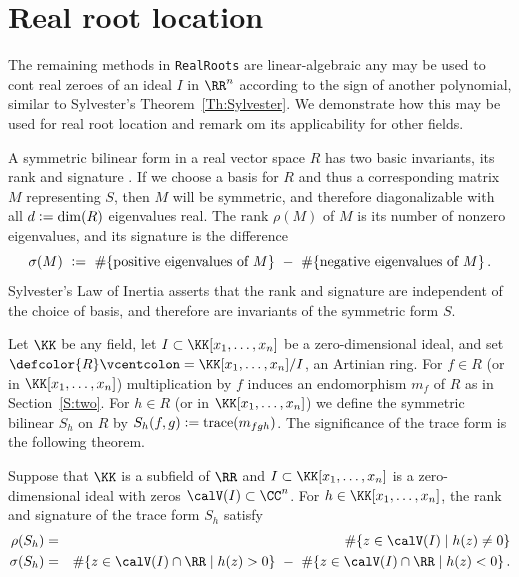 
\section{Real root location}\label{S:three}
%
%
The remaining methods in  \texttt{RealRoots} are linear-algebraic any may be used to cont real zeroes of an ideal $I$ in $\RR^n$ according to
the sign of another polynomial, similar to Sylvester's Theorem~\ref{Th:Sylvester}.
We demonstrate how this may be used for real root location and remark om its applicability for other fields.

A symmetric bilinear form  in a real vector space $R$ has two basic invariants, its rank  and signature
.
If we choose a basis for $R$ and thus a corresponding matrix $M$ representing $S$, then $M$ will be symmetric, and therefore 
diagonalizable with all $d\vcentcolon = \dim(R)$ eigenvalues real.
The rank $\rho(M)$ of $M$ is its number of nonzero eigenvalues, and its signature  is the difference
\[
\sigma(M)\ \vcentcolon =\ \#\{\mbox{positive eigenvalues of $M$}\}
\ -\ \#\{\mbox{negative eigenvalues of $M$}\}\,.
\]
Sylvester's Law of Inertia asserts that the rank and signature are independent of the choice of basis, and therefore are invariants of the
symmetric form $S$.

Let $\KK$ be any field, let $I\subset\KK[x_1,\dotsc,x_n]$ be a zero-dimensional ideal, and set
$\defcolor{R}\vcentcolon=\KK[x_1,\dotsc,x_n]/I$, an  Artinian ring.    
For $f\in R$ (or in $\KK[x_1,\dotsc,x_n]$) multiplication by $f$ induces an endomorphism $m_f$ of $R$ as in Section~\ref{S:two}.
For $h\in R$ (or in $\KK[x_1,\dotsc,x_n]$) we define the symmetric bilinear  $S_h$ on $R$ by
$S_h(f,g)\vcentcolon= \mbox{trace}(m_{fgh})$.
The significance of the trace form is the following theorem.

\begin{theorem}
  Suppose that $\KK$ is a subfield of $\RR$ and $I\subset\KK[x_1,\dotsc,x_n]$ is a zero-dimensional ideal with zeros
  $\calV(I)\subset\CC^n$.
  For $h\in\KK[x_1,\dotsc,x_n]$, the rank and signature of the trace form $S_h$ satisfy
  \begin{eqnarray}
    \rho(S_h)&=&    \label{Eq:traceCount}
      \#\{ z \in \calV(I) \mid h(z)\neq 0\}   \\
    \sigma(S_h)&=&
        \#\{ z \in \calV(I)\cap\RR \mid h(z)> 0\} \ -\  \nonumber
        \#\{ z \in \calV(I)\cap\RR \mid h(z)< 0\} \,.
  \end{eqnarray}
\end{theorem}



